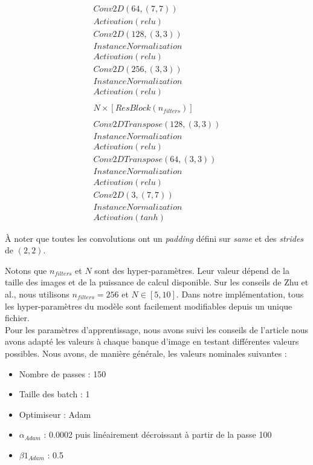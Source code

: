 \[ \begin{array}{lcr}
Conv2D(64, (7,7)) \\
Activation(relu) \\

Conv2D(128, (3,3)) \\
InstanceNormalization\\
Activation(relu)\\

Conv2D(256, (3,3)) \\
InstanceNormalization\\
Activation(relu)\\\\

N \times [ResBlock(n_{filters})]\\\\

Conv2DTranspose(128, (3,3)) \\
InstanceNormalization\\
Activation(relu)\\

Conv2DTranspose(64, (3,3)) \\
InstanceNormalization\\
Activation(relu)\\

Conv2D(3, (7,7)) \\
InstanceNormalization\\

Activation(tanh) \end{array}\]

À noter que toutes les convolutions ont un \textit{padding} défini sur \textit{same} et des \textit{strides} de $(2, 2)$.

Notons que $n_{filters}$ et $N$ sont des hyper-paramètres. Leur valeur dépend de la taille des images et de la puissance de calcul disponible. Sur les conseils de Zhu et al., nous utilisons $n_{filters} = 256$ et $N \in [5, 10]$. Dans notre implémentation, tous les hyper-paramètres du modèle sont facilement modifiables depuis un unique fichier. \\


Pour les paramètres d'apprentissage, nous avons suivi les conseils de l'article nous avons adapté les valeurs à chaque banque d'image en testant différentes valeurs possibles. Nous avons, de manière générale, les valeurs nominales suivantes : \\

\begin{itemize}
  \item Nombre de passes : 150
  \item Taille des batch : 1
  \item Optimiseur : Adam
  \item $\alpha_{Adam}$ : 0.0002 puis linéairement décroissant à partir de la passe 100
  \item $\beta1_{Adam}$ : 0.5\\
\end{itemize}

